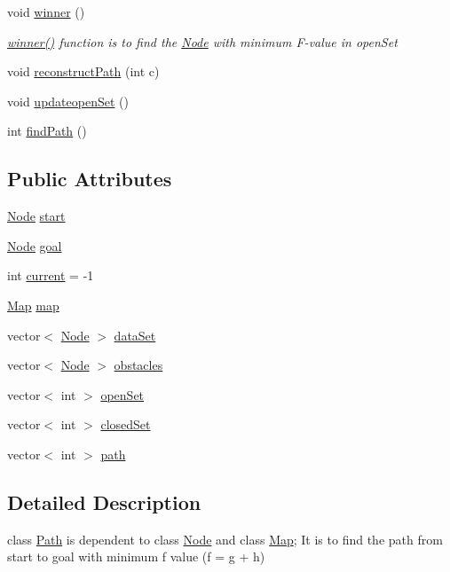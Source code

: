 \begin{DoxyCompactItemize}
\mbox{\label{classPath_a5ab3041f956a871aa5c8dd7b6f225f2b}} 
void \hyperlink{classPath_a5ab3041f956a871aa5c8dd7b6f225f2b}{winner} ()
\begin{DoxyCompactList}\small\item\em \hyperlink{classPath_a5ab3041f956a871aa5c8dd7b6f225f2b}{winner()} function is to find the \hyperlink{classNode}{Node} with minimum F-\/value in open\+Set \end{DoxyCompactList}\item 
void \hyperlink{classPath_aef81fce3aff1781467bbd0c620220c78}{reconstruct\+Path} (int c)
\item 
void \hyperlink{classPath_a9de6800363177b6346a05ca55ccc2d05}{updateopen\+Set} ()
\item 
int \hyperlink{classPath_a038e211ce369fa9b447a7dd674104166}{find\+Path} ()
\end{DoxyCompactItemize}
\subsection*{Public Attributes}
\begin{DoxyCompactItemize}
\item 
\hyperlink{classNode}{Node} \hyperlink{classPath_a82f8a235d983ef188f162bf650ef4a47}{start}
\item 
\hyperlink{classNode}{Node} \hyperlink{classPath_a84f44ef4fe5af14812dfcbc9f8625fc1}{goal}
\item 
int \hyperlink{classPath_a3070eec5809bb39f9738b1025a9b567f}{current} = -\/1
\item 
\hyperlink{classMap}{Map} \hyperlink{classPath_ac69916a76b41530a848ceb3238b82441}{map}
\item 
vector$<$ \hyperlink{classNode}{Node} $>$ \hyperlink{classPath_a7aea225a45024d0b947d9095a5bd845e}{data\+Set}
\item 
vector$<$ \hyperlink{classNode}{Node} $>$ \hyperlink{classPath_a367bfca621140baf7bf10bf10dde17de}{obstacles}
\item 
vector$<$ int $>$ \hyperlink{classPath_ae16b96f2224219e117523d0693e66d3c}{open\+Set}
\item 
vector$<$ int $>$ \hyperlink{classPath_ad8a4a1de4c251768f60b28834466caaa}{closed\+Set}
\item 
vector$<$ int $>$ \hyperlink{classPath_aca5a9fe40d1b40eb19a552d86c6b8891}{path}
\end{DoxyCompactItemize}


\subsection{Detailed Description}
class \hyperlink{classPath}{Path} is dependent to class \hyperlink{classNode}{Node} and class \hyperlink{classMap}{Map}; It is to find the path from start to goal with minimum f value (f = g + h) 

